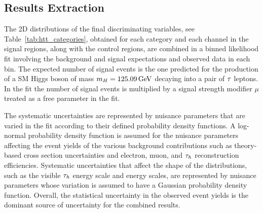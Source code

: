 %


\subsection{Results Extraction}
\label{sec:htt_fit_details}
The 2D distributions of the final discriminating variables, see Table~\ref{tab:htt_categories}, 
obtained for each category and each channel in the 
signal regions, along with the control regions, are combined in a binned likelihood fit involving the 
background and signal expectations and observed data in each bin.
The expected number of signal events is the one predicted for the production of
a SM Higgs boson of mass $m_{H}=125.09\,\mathrm{GeV}$ decaying into a pair of $\tau$ leptons. In the fit
the number of signal events is
multiplied by a signal strength modifier $\mu$ treated as a free parameter in the fit.

The systematic uncertainties are represented by nuisance parameters that are varied in the fit 
according to their defined probability density functions.
A log-normal probability density function is assumed for the nuisance parameters affecting the event yields 
of the various background contributions such as theory-based cross section uncertainties and
electron, muon, and $\tau_{h}$ reconstruction efficiencies. Systematic uncertainties that affect the shape of the 
distributions, such as the visible $\tau_{h}$ energy scale and \etvecmiss energy scales, are represented 
by nuisance parameters whose variation 
is assumed to have a Gaussian probability density function.
Overall, the statistical uncertainty in the observed event yields is the dominant source of uncertainty 
for the combined results.



